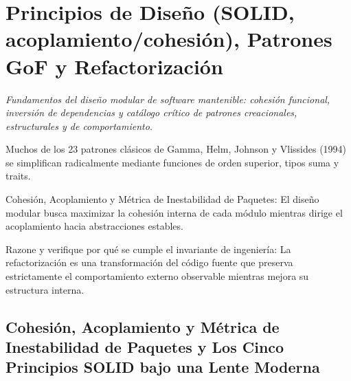 \documentclass{book}
\begin{document}
\chapter{Principios de Diseño (SOLID, acoplamiento/cohesión), Patrones GoF y Refactorización}
\label{chap:ch-01}

\noindent\textit{Fundamentos del diseño modular de software mantenible: cohesión funcional, inversión de dependencias y catálogo crítico de patrones creacionales, estructurales y de comportamiento.}

\begin{tcolorbox}[title={Consejo}, studiumtip, breakable]

Muchos de los 23 patrones clásicos de Gamma, Helm, Johnson y Vlissides (1994) se simplifican radicalmente mediante funciones de orden superior, tipos suma y traits.
\end{tcolorbox}

\begin{tcolorbox}[title={Definición}, studiumdef, breakable]

Cohesión, Acoplamiento y Métrica de Inestabilidad de Paquetes: El diseño modular busca maximizar la cohesión interna de cada módulo mientras dirige el acoplamiento hacia abstracciones estables.
\end{tcolorbox}

\begin{tcolorbox}[title={Autoficha}, studiumcheck, breakable]

Razone y verifique por qué se cumple el invariante de ingeniería: La refactorización es una transformación del código fuente que preserva estrictamente el comportamiento externo observable mientras mejora su estructura interna.
\end{tcolorbox}

\section{Cohesión, Acoplamiento y Métrica de Inestabilidad de Paquetes y Los Cinco Principios SOLID bajo una Lente Moderna}
\end{document}
